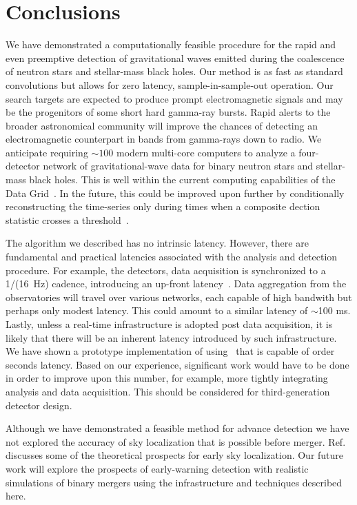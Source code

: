 \section{Conclusions}
\label{SECV}\label{sec:conclusions}

We have demonstrated a computationally feasible procedure for the rapid and
even preemptive detection of gravitational waves emitted during the coalescence
of neutron stars and stellar-mass black holes. Our method is as fast as
standard \fft{} convolutions but allows for zero latency, sample-in-sample-out
operation.  Our search targets are expected to produce prompt electromagnetic
signals and may be the progenitors of some short hard gamma-ray bursts.  Rapid
alerts to the broader astronomical community will improve the chances of
detecting an electromagnetic counterpart in bands from gamma-rays down to
radio.  We anticipate requiring $\sim100$ modern multi-core computers to
analyze a four-detector network of gravitational-wave data for binary neutron
stars and stellar-mass black holes.  This is well within the current computing
capabilities of the \LIGO{} Data Grid~\cite{LDG}. In the future, this could be
improved upon further by conditionally reconstructing the \SNR{} time-series
only during times when a composite dection statistic crosses a
threshold~\cite{svd-compdetstat}.

The algorithm we described has no intrinsic latency.  However, there are
fundamental and practical latencies associated with the analysis and detection
procedure. For example, the \LIGO{} detectors, data acquisition is synchronized
to a 1/(16~Hz) cadence, introducing an up-front latency~\cite{CITE_CDS}. Data
aggregation from
the observatories will travel over various networks, each capable of high
bandwith but perhaps only modest latency.  This could amount to a similar
latency of $\sim$100 ms.  Lastly, unless a real-time infrastructure is adopted
post data acquisition, it is likely that there will be an inherent latency
introduced by such infrastructure.  We have shown a prototype implementation
of \lloid{} using \gstlal\ that is capable of order seconds latency. Based
on our experience, significant work would have to be done in order to improve
upon this number, for example, more tightly integrating analysis and data
acquisition. This should be considered for third-generation detector design.

Although we have demonstrated a feasible method for advance detection we have
not explored the accuracy of sky localization that is possible before merger.
Ref.~\cite{Fairhurst2009} discusses some of the theoretical prospects for early sky
localization.  Our future work will explore the prospects of early-warning
detection with realistic simulations of binary mergers using the infrastructure
and techniques described here. 

